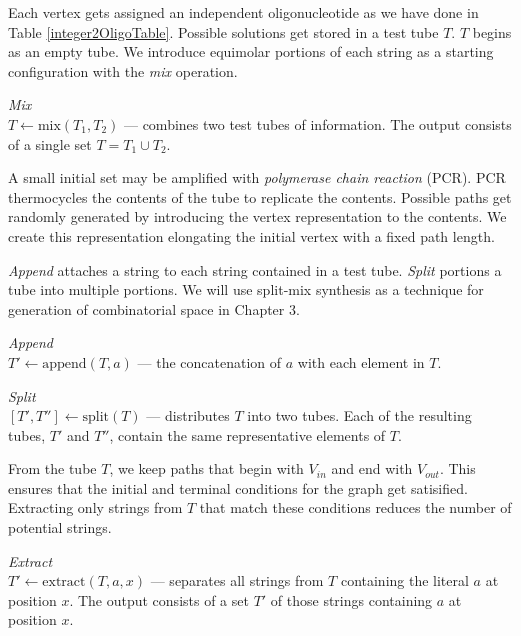 Each vertex gets assigned an independent oligonucleotide as we have done in Table \ref{integer2OligoTable}.  Possible solutions get stored in a test tube $T$.  $T$ begins as an empty tube.  We introduce equimolar portions of each string as a starting configuration with the \textit{mix} operation. 
\begin{definition}
\textit{Mix}\\
$ T \leftarrow \text{mix}( T_1, T_2)$ --- combines two test tubes of information.  The output consists of a single set $T = T_1 \cup T_2$.
\end{definition}

A small initial set may be amplified with \textit{polymerase chain reaction} (PCR).  PCR thermocycles the contents of the tube to replicate the contents. Possible paths get randomly generated by introducing the vertex representation to the contents.  We create this representation elongating the initial vertex with a fixed path length.

\textit{Append} attaches a string to each string contained in a test tube.  \textit{Split} portions a tube into multiple portions.  We will use split-mix synthesis as a technique for generation of combinatorial space in Chapter 3.

\begin{definition}
\textit{Append}\\
$T' \leftarrow \text{append}( T, a)$ --- the concatenation of $a$ with each element in $T$.  
\end{definition}

\begin{definition}
\textit{Split}\\
$[T', T''] \leftarrow \text{split}( T)$ --- distributes $T$ into two tubes.  Each of the resulting tubes, $T'$ and $T''$,  contain the same representative elements of $T$.
\end{definition}

From the tube $T$, we keep paths that begin with $V_{in}$ and end with $V_{out}$.  This ensures that the initial and terminal conditions for the graph get satisified.  Extracting only strings from $T$ that match these conditions reduces the number of potential strings.

\begin{definition}
\textit{Extract}\\
$ T' \leftarrow \text{extract}( T, a, x)$ --- separates all strings from $T$ containing the literal $a$ at position $x$.  The output consists of a set $T'$ of those strings containing $a$ at position $x$.
\end{definition}

